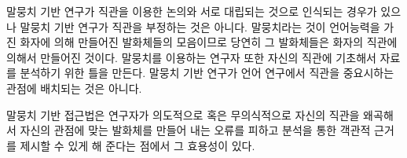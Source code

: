 말뭉치 기반 연구가 직관을 이용한 논의와 서로 대립되는 것으로 인식되는 경우가
있으나 말뭉치 기반 연구가 직관을 부정하는 것은 아니다. 말뭉치라는 것이
언어능력을 가진 화자에 의해 만들어진 발화체들의 모음이므로 당연히 그 발화체들은
화자의 직관에 의해서 만들어진 것이다. 말뭉치를 이용하는 연구자 또한 자신의
직관에 기초해서 자료를 분석하기 위한 틀을 만든다. 말뭉치 기반 연구가 언어
연구에서 직관을 중요시하는 관점에 배치되는 것은 아니다. 

말뭉치 기반 접근법은 연구자가 의도적으로 혹은 무의식적으로 자신의 직관을 왜곡해서
자신의 관점에 맞는 발화체를 만들어 내는 오류를 피하고 분석을 통한 객관적 근거를
제시할 수 있게 해 준다는 점에서 그 효용성이 있다.





